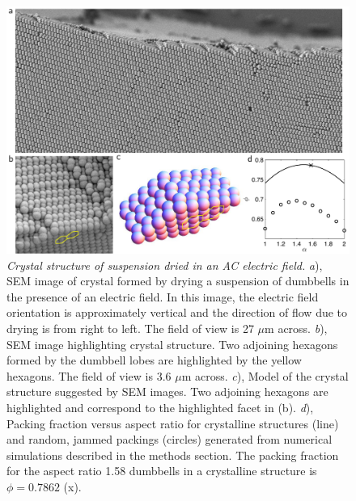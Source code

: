 \begin{figure}[htbp]
\centering
\includegraphics[width=1.0\textwidth]{figures/CFigure3.pdf}
\caption{\label{fig:structure1} \emph{Crystal structure of suspension dried in an AC electric field.}
	\emph{a}), SEM image of crystal formed by drying a suspension of dumbbells in the presence of an electric field. In this image, the electric field orientation is approximately vertical and the direction of flow due to drying is from right to left. The field of view is 27 $\mu$m across.
	\emph{b}), SEM image highlighting crystal structure. Two adjoining hexagons formed by the dumbbell lobes are highlighted by the yellow hexagons. The field of view is 3.6 $\mu$m across.
	\emph{c}), Model of the crystal structure suggested by SEM images. Two adjoining hexagons are highlighted and correspond to the highlighted facet in (b).
	\emph{d}), Packing fraction versus aspect ratio for crystalline structures (line) and random, jammed packings (circles) generated from numerical simulations described in the methods section. The packing fraction for the aspect ratio 1.58 dumbbells in a crystalline structure is $\phi = 0.7862$ (x).}
\end{figure}

